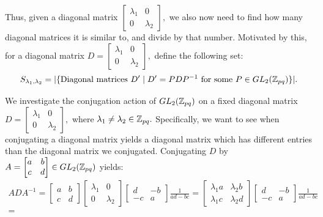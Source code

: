 \documentclass[11pt, titlepage, a4paper]{article}
\begin{document}
Thus, given a diagonal matrix $\begin{bmatrix}
 \lambda_{1} & 0 \\
 0 & \lambda_{2}
\end{bmatrix},$ we also now need to find how many diagonal matrices it is similar to, and divide by that number. Motivated by this, for a diagonal matrix $D = 
\begin{bmatrix}
 \lambda_{1} & 0 \\
 0 & \lambda_{2}
\end{bmatrix},
$ define the following set:
\begin{align*}
S_{\lambda_{1},\lambda_{2}} =  |\{ \text{Diagonal matrices } D' \mid  D' = PDP^{-1} \text{ for some } P \in GL_{2}(\mathbb{Z}_{pq}) \}|.
 \end{align*}
 
 
\begin{observation}\label{conj}
 We investigate the conjugation action of $GL_{2}(\mathbb{Z}_{pq})$ on a fixed diagonal matrix $D = 
\begin{bmatrix}
 \lambda_{1} & 0 \\
 0 & \lambda_{2}
\end{bmatrix},
$ where $\lambda_{1}\neq \lambda_{2} \in \mathbb{Z}_{pq}.$ Specifically, we want to see when conjugating a diagonal matrix yields a diagonal matrix which has different entries than the diagonal matrix we conjugated. Conjugating $D$ by $A = \begin{bmatrix}
 a & b \\
 c & d
\end{bmatrix} \in GL_{2}(\mathbb{Z}_{pq})$ yields:
\begin{align*}
ADA^{-1}=  \begin{bmatrix}
 a & b \\
 c & d
\end{bmatrix} \begin{bmatrix}
 \lambda_{1} & 0 \\
 0 & \lambda_{2}
\end{bmatrix} \begin{bmatrix}
 d & -b \\
 -c & a
\end{bmatrix}\frac{1}{ad-bc} = \begin{bmatrix}
 \lambda_{1}a & \lambda_{2}b \\
 \lambda_{1}c & \lambda_{2}d
\end{bmatrix} \begin{bmatrix}
 d & -b \\
 -c & a
\end{bmatrix}\frac{1}{ad-bc} \\ = 

\end{align*}
\end{observation}
\end{document}
